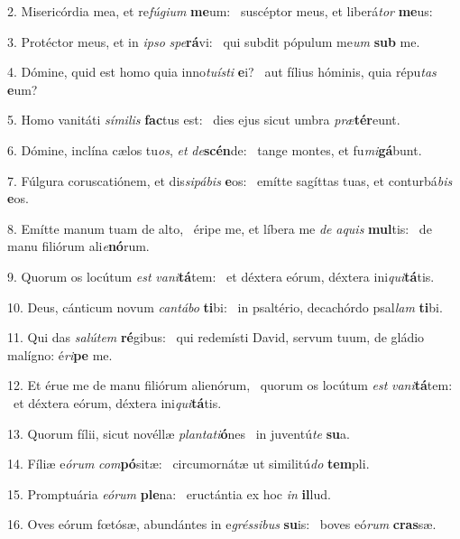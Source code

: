 2. Misericórdia mea, et re\textit{fú}\textit{gi}\textit{um} \textbf{me}um: \ast\  suscéptor meus, et liberá\textit{tor} \textbf{me}us:\

3. Protéctor meus, et in \textit{ip}\textit{so} \textit{spe}\textbf{rá}vi: \ast\  qui subdit pópulum me\textit{um} \textbf{sub} me.\

4. Dómine, quid est homo quia inno\textit{tu}\textit{ís}\textit{ti} \textbf{e}i? \ast\  aut fílius hóminis, quia répu\textit{tas} \textbf{e}um?\

5. Homo vanitáti \textit{sí}\textit{mi}\textit{lis} \textbf{fac}tus est: \ast\  dies ejus sicut umbra \textit{præ}\textbf{tér}eunt.\

6. Dómine, inclína cælos tu\textit{os}, \textit{et} \textit{de}\textbf{scén}de: \ast\  tange montes, et fu\textit{mi}\textbf{gá}bunt.\

7. Fúlgura coruscatiónem, et dis\textit{si}\textit{pá}\textit{bis} \textbf{e}os: \ast\  emítte sagíttas tuas, et conturbá\textit{bis} \textbf{e}os.\

8. Emítte manum tuam de alto, \dag\  éripe me, et líbera me \textit{de} \textit{a}\textit{quis} \textbf{mul}tis: \ast\  de manu filiórum ali\textit{e}\textbf{nó}rum.\

9. Quorum os locútum \textit{est} \textit{va}\textit{ni}\textbf{tá}tem: \ast\  et déxtera eórum, déxtera ini\textit{qui}\textbf{tá}tis.\

10. Deus, cánticum novum \textit{can}\textit{tá}\textit{bo} \textbf{ti}bi: \ast\  in psaltério, decachórdo psal\textit{lam} \textbf{ti}bi.\

11. Qui das \textit{sa}\textit{lú}\textit{tem} \textbf{ré}gibus: \ast\  qui redemísti David, servum tuum, de gládio malígno: é\textit{ri}\textbf{pe} me.\

12. Et érue me de manu filiórum alienórum, \dag\  quorum os locútum \textit{est} \textit{va}\textit{ni}\textbf{tá}tem: \ast\  et déxtera eórum, déxtera ini\textit{qui}\textbf{tá}tis.\

13. Quorum fílii, sicut novéllæ \textit{plan}\textit{ta}\textit{ti}\textbf{ó}nes \ast\  in juventú\textit{te} \textbf{su}a.\

14. Fíliæ e\textit{ó}\textit{rum} \textit{com}\textbf{pó}sitæ: \ast\  circumornátæ ut similitú\textit{do} \textbf{tem}pli.\

15. Promptuária \textit{e}\textit{ó}\textit{rum} \textbf{ple}na: \ast\  eructántia ex hoc \textit{in} \textbf{il}lud.\

16. Oves eórum fœtósæ, abundántes in e\textit{grés}\textit{si}\textit{bus} \textbf{su}is: \ast\  boves eó\textit{rum} \textbf{cras}sæ.\

